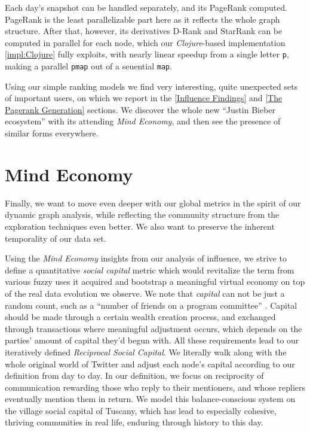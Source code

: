 \documentclass[10pt,oneside]{memoir}
\begin{document}
Each day's snapshot can be handled separately, and its PageRank computed.  PageRank is the least parallelizable part here as it reflects the whole graph structure.  After that, however, its derivatives D-Rank and StarRank can be computed in parallel for each node, which our {\itshape Clojure}-based implementation \ref{impl:Clojure} fully exploits, with nearly linear speedup from a single letter \texttt{p}, making a parallel \texttt{pmap} out of a seuential \texttt{map}.


Using our simple ranking models we find very interesting, quite unexpected sets of important users, on which we report in the \ref{Influence Findings} and \ref{The Pagerank Generation} sections.  We discover the whole new ``Justin Bieber ecosystem'' with its attending {\itshape Mind Economy}, and then see the presence of similar forms everywhere.


\pagebreak \section{Mind Economy}
\label{mindeconomy}

Finally, we want to move even deeper with our global metrics in the spirit of our dynamic graph analysis, while reflecting the community structure from the exploration techniques even better.  We also want to preserve the inherent temporality of our data set.


Using the {\itshape Mind Economy} insights from our analysis of influence, we strive to define a quantitative {\itshape social capital} metric which would revitalize the term from various fuzzy uses it acquired and bootstrap a meaningful virtual economy on top of the real data evolution we observe.  We note that {\itshape capital} can not be just a random count, such as a ``number of friends on a program committee'' \cite{Licamele:2005:Benefit}.  Capital should be made through a certain wealth creation process, and exchanged through transactions where meaningful adjustment occurs, which depends on the parties' amount of capital they'd begun with.  All these requirements lead to our iteratively defined {\itshape Reciprocal Social Capital}.  We literally walk along with the whole original world of Twitter and adjust each node's capital according to our definition from day to day.  In our definition, we focus on reciprocity of communication rewarding those who reply to their mentioners, and whose repliers eventually mention them in return.  We model this balance-conscious system on the village social capital of Tuscany, which has lead to especially cohesive, thriving communities in real life, enduring through history to this day.
\end{document}

